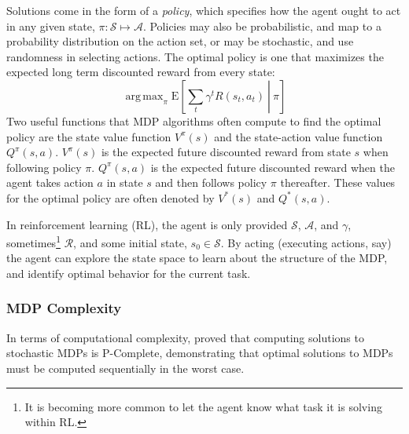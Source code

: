 \documentclass[11pt]{article}
\newcommand\davenote[1]{\textcolor{blue}{Dave: #1}}
\DeclareMathOperator*{\argmax}{arg\,max}
\begin{document}
Solutions come in the form of a {\it policy}, which specifies how the agent ought to act in any given state, $\pi : \mathcal{S} \mapsto \mathcal{A}$. Policies may also be probabilistic, and map to a probability distribution on the action set, or may be stochastic, and use randomness in selecting actions. The optimal policy is one that maximizes the expected long term discounted reward from every state:
\begin{equation}
\argmax_\pi \left.\text{E}\left[\sum_t \gamma^t R(s_t,a_t)\ \right|\ \pi\right]
\end{equation}
Two useful functions that MDP algorithms often compute to find the optimal policy are the state value function $V^{\pi}(s)$ and the state-action value function $Q^{\pi}(s, a)$. $V^{\pi}(s)$ is the expected future discounted reward from state $s$ when following policy $\pi$. $Q^{\pi}(s, a)$ is the expected future discounted reward when the agent takes action $a$ in state $s$ and then follows policy $\pi$ thereafter. These values for the optimal policy are often denoted by $V^*(s)$ and $Q^*(s, a)$.


In reinforcement learning (RL), the agent is only provided $\mathcal{S}$, $\mathcal{A}$, and $\gamma$, sometimes\footnote{It is becoming more common to let the agent know what task it is solving within RL.} $\mathcal{R}$, and some initial state, $s_0 \in \mathcal{S}$. By acting (executing actions, say) the agent can explore the state space to learn about the structure of the MDP, and identify optimal behavior for the current task.


\subsubsection{MDP Complexity}

In terms of computational complexity,
\cite{papadimitriou1987complexity} proved that computing solutions to stochastic MDPs is P-Complete, demonstrating that optimal solutions to MDPs must be computed sequentially in the worst case.
\end{document}
